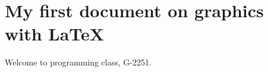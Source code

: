 \documentclass{report}
\begin{document}
\section{My first document on graphics with \LaTeX}

Welcome to programming class, 
G-2251. 
\end{document}
